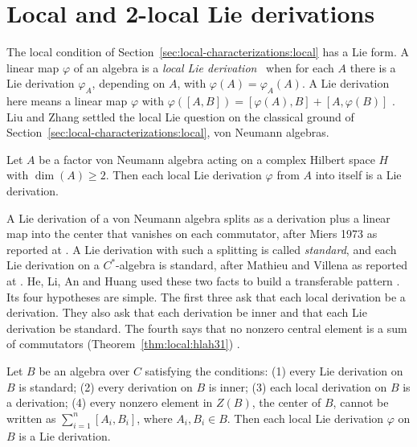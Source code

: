 \section{Local and 2-local Lie derivations}\label{sec:local-characterizations:local-lie-jordan}

The local condition of Section~\ref{sec:local-characterizations:local} has
a Lie form. A linear map $\varphi$ of an algebra is a \emph{local Lie
derivation}~\cite[p.~209]{LiuZhang2017LocalLie} when for each $A$ there is a Lie derivation $\varphi_A$,
depending on $A$, with $\varphi(A)=\varphi_A(A)$. A Lie derivation here means a linear
map $\varphi$ with $\varphi([A,B])=[\varphi(A),B]+[A,\varphi(B)]$
\cite[p.~209]{LiuZhang2017LocalLie}. Liu and Zhang settled the local Lie
question on the classical ground of
Section~\ref{sec:local-characterizations:local}, von Neumann algebras.

\begin{theorem}\label{thm:local:liuzhang}
Let $A$ be a factor von Neumann algebra acting on a complex Hilbert space
$H$ with $\dim(A)\geq 2$. Then each local Lie derivation $\varphi$ from
$A$ into itself is a Lie derivation.
\end{theorem}

A Lie derivation of a von Neumann algebra splits as a derivation plus a
linear map into the center that vanishes on each commutator, after Miers
1973 as reported at \cite[p.~209]{LiuZhang2017LocalLie}. A Lie derivation
with such a splitting is called \emph{standard}, and each Lie derivation
on a $C^*$-algebra is standard, after Mathieu and Villena as reported at
\cite[p.~725]{HeLiAnHuang2018}. He, Li, An and Huang used these two facts
to build a transferable pattern \cite[p.~727]{HeLiAnHuang2018}. Its four
hypotheses are simple. The first three ask that each local derivation be a
derivation. They also ask that each derivation be inner and that each Lie
derivation be standard. The fourth says that no nonzero central element is
a sum of commutators (Theorem~\ref{thm:local:hlah31}) \cite[p.~727]{HeLiAnHuang2018}.

\begin{theorem}\label{thm:local:hlah31}
Let $B$ be an algebra over $C$ satisfying the conditions: (1) every Lie
derivation on $B$ is standard; (2) every derivation on $B$ is inner;
(3) each local derivation on $B$ is a derivation; (4) every nonzero
element in $Z(B)$, the center of $B$, cannot be written as
$\sum_{i=1}^{n}[A_i,B_i]$, where $A_i,B_i\in B$. Then each local Lie
derivation $\varphi$ on $B$ is a Lie derivation.
\end{theorem}

